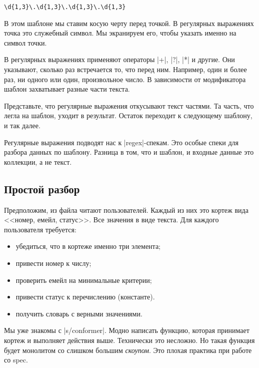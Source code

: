 \begin{verbatim}
\d{1,3}\.\d{1,3}\.\d{1,3}\.\d{1,3}
\end{verbatim}

В этом шаблоне мы ставим косую черту перед точкой. В регулярных выражениях точка
это служебный символ. Мы экранируем его, чтобы указать именно на символ точки.

В регулярных выражениях применяют операторы \spverb|+|, \spverb|?|, \spverb|*| и
другие. Они указывают, сколько раз встречается то, что перед ним. Например, один
и более раз, ни одного или один, произвольное число. В зависимости от
модификатора шаблон захватывает разные части текста.

Представьте, что регулярные выражения откусывают текст частями. Та часть, что
легла на шаблон, уходит в результат. Остаток переходит к следующему шаблону, и
так далее.

Регулярные выражения подводят нас к \spverb|regex|-спекам. Это особые спеки для
разбора данных по шаблону. Разница в том, что и шаблон, и входные данные это
коллекции, а не текст.

\subsection{Простой разбор}

Предположим, из файла читают пользователей. Каждый из них это кортеж вида
<<номер, емейл, статус>>. Все значения в виде текста. Для каждого пользователя
требуется:

\begin{itemize}

\item
  убедиться, что в кортеже именно три элемента;

\item
  привести номер к числу;

\item
  проверить емейл на минимальные критерии;

\item
  привести статус к перечислению (константе).

\item
  получить словарь с верными значениями.

\end{itemize}

Мы уже знакомы с \spverb|s/conformer|. Модно написать функцию, которая принимает
кортеж и выполняет действия выше. Технически это несложно. Но такая функция
будет монолитом со слишком большим \emph{скоупом}. Это плохая практика при
работе со spec.

